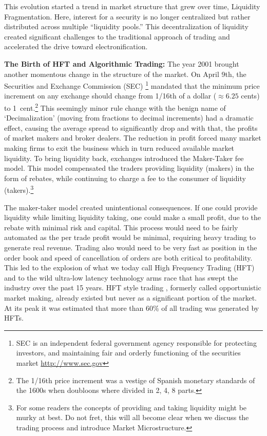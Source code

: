 This evolution started a trend in market structure that grew over time, Liquidity Fragmentation. Here, interest for a security is no longer centralized but rather distributed across multiple ``liquidity pools.''  This decentralization of liquidity created significant challenges to the traditional approach of trading and accelerated the drive toward electronification. \twomedskip


\noindent\textbf{The Birth of HFT and Algorithmic Trading:} The year 2001 brought another momentous change in the structure of the market. On April 9th, the Securities and Exchange Commission (SEC) \footnote{SEC is an independent federal government agency responsible for protecting investors, and maintaining fair and orderly functioning of the securities market \url{http://www.sec.gov} } mandated that the minimum price increment on any exchange should change from 1/16th of a dollar ($\approx6.25$ cents) to 1~cent.\footnote{The 1/16th price increment was a vestige of Spanish monetary standards of the 1600s when doubloons where divided in 2, 4, 8 parts.} This seemingly minor rule change with the benign name of `Decimalization' (moving from fractions to decimal increments) had a dramatic effect, causing the average spread to significantly drop and with that, the profits of market makers and broker dealers. The reduction in profit forced many market making firms to exit the business which in turn reduced available market liquidity. To bring liquidity back, exchanges introduced the Maker-Taker fee model. This model compensated the traders providing liquidity (makers) in the form of rebates, while continuing to charge a fee to the consumer of liquidity (takers).\footnote{For some readers the concepts of providing and taking liquidity might be murky at best. Do not fret, this will all become clear when we discuss the trading process and introduce Market Microstructure.}

The maker-taker model created unintentional consequences. If one could provide liquidity while limiting liquidity taking, one could make a small profit, due to the rebate with minimal risk and capital. This process would need to be fairly automated as the per trade profit would be minimal, requiring heavy trading to generate real revenue. Trading also would need to be very fast as position in the order book and speed of cancellation of orders are both critical to profitability. This led to the explosion of what we today call High Frequency Trading (HFT) and to the wild ultra-low latency technology arms race that has swept the industry over the past 15 years. HFT style trading , formerly called opportunistic market making, already existed but never as a significant portion of the market. At its peak it was estimated that more than 60\% of all trading was generated by HFTs.

